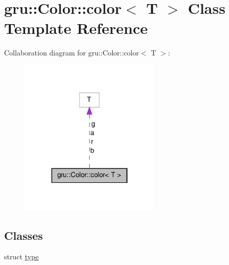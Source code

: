 \hypertarget{classgru_1_1Color_1_1color}{\section{gru\-:\-:\-Color\-:\-:color$<$ \-T $>$ \-Class \-Template \-Reference}
\label{classgru_1_1Color_1_1color}
}


\-Collaboration diagram for gru\-:\-:\-Color\-:\-:color$<$ \-T $>$\-:
\nopagebreak
\begin{figure}[H]
\begin{center}
\leavevmode
\includegraphics[width=190pt]{classgru_1_1Color_1_1color__coll__graph}
\end{center}
\end{figure}
\subsection*{\-Classes}
\begin{DoxyCompactItemize}
\item 
struct \hyperlink{structgru_1_1Color_1_1color_1_1type}{type}
\end{DoxyCompactItemize}
